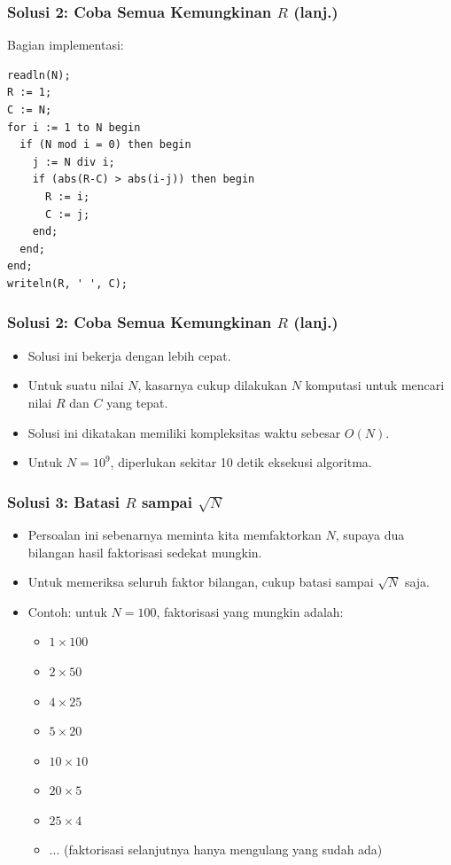 \documentclass{beamer}
\begin{document}
\begin{frame}[fragile]
\frametitle{Solusi 2: Coba Semua Kemungkinan $R$ (lanj.)}
Bagian implementasi:
\begin{lstlisting}
readln(N);
R := 1;
C := N;
for i := 1 to N begin
  if (N mod i = 0) then begin
    j := N div i;
    if (abs(R-C) > abs(i-j)) then begin
      R := i;
      C := j;  
    end;
  end;
end;
writeln(R, ' ', C);
\end{lstlisting}
\end{frame}

\begin{frame}[fragile]
\frametitle{Solusi 2: Coba Semua Kemungkinan $R$ (lanj.)}
\begin{itemize}
	\item Solusi ini bekerja dengan lebih cepat.
	\item Untuk suatu nilai $N$, kasarnya cukup dilakukan $N$ komputasi untuk mencari nilai $R$ dan $C$ yang tepat.
	\item Solusi ini dikatakan memiliki kompleksitas waktu sebesar $O(N)$.
	\item Untuk $N = 10^9$, diperlukan sekitar 10 detik eksekusi algoritma.
\end{itemize}
\end{frame}

\begin{frame}[fragile]
\frametitle{Solusi 3: Batasi $R$ sampai $\sqrt{N}$}
\begin{itemize}
	\item Persoalan ini sebenarnya meminta kita memfaktorkan $N$, supaya dua bilangan hasil faktorisasi sedekat mungkin.
	\item Untuk memeriksa seluruh faktor bilangan, cukup batasi sampai $\sqrt{N}$ saja. 
	\item Contoh: untuk $N = 100$, faktorisasi yang mungkin adalah:
	\begin{itemize}
		\item $1 \times 100$
		\item $2 \times 50$
		\item $4 \times 25$
		\item $5 \times 20$
		\item $10 \times 10$
		\item $20 \times 5$
		\item $25 \times 4$
		\item $...$ (faktorisasi selanjutnya hanya mengulang yang sudah ada)
	\end{itemize}
\end{itemize}
\end{frame}
\end{document}
